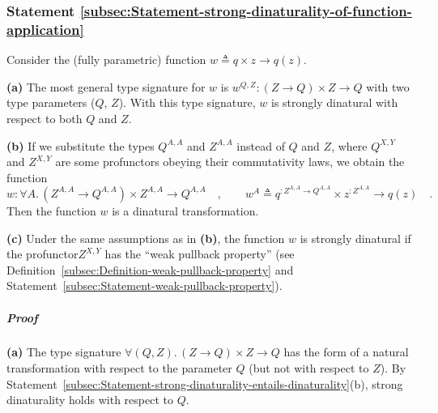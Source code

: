 \subsubsection{Statement \label{subsec:Statement-strong-dinaturality-of-function-application}\ref{subsec:Statement-strong-dinaturality-of-function-application}}

Consider the (fully parametric) function $w\triangleq q\times z\rightarrow q(z)$.

\textbf{(a)} The most general type signature for $w$ is $w^{Q,Z}:(Z\rightarrow Q)\times Z\rightarrow Q$
with two type parameters ($Q$, $Z$). With this type signature, $w$
is strongly dinatural with respect to both $Q$ and $Z$.

\textbf{(b)} If we substitute the types $Q^{A,A}$ and $Z^{A,A}$
instead of $Q$ and $Z$, where $Q^{X,Y}$ and $Z^{X,Y}$ are some
profunctors obeying their commutativity laws, we obtain the function
\[
w:\forall A.\,(Z^{A,A}\rightarrow Q^{A,A})\times Z^{A,A}\rightarrow Q^{A,A}\quad,\quad\quad w^{A}\triangleq q^{:Z^{A,A}\rightarrow Q^{A,A}}\times z^{:Z^{A,A}}\rightarrow q(z)\quad.
\]
Then the function $w$ is a dinatural transformation.

\textbf{(c)} Under the same assumptions as in \textbf{(b)}, the function
$w$ is strongly dinatural if the profunctor$Z^{X,Y}$ has the \textsf{``}weak
pullback property\textsf{''} (see Definition~\ref{subsec:Definition-weak-pullback-property}
and Statement~\ref{subsec:Statement-weak-pullback-property}). %
\begin{comment}
Otherwise, $w$ is \emph{not} necessarily strongly dinatural. \textemdash{}
not clear if we can show a counterexample
\end{comment}


\subparagraph{Proof}

\textbf{(a)} The type signature $\forall(Q,Z).\,(Z\rightarrow Q)\times Z\rightarrow Q$
has the form of a natural transformation with respect to the parameter
$Q$ (but not with respect to $Z$). By Statement~\ref{subsec:Statement-strong-dinaturality-entails-dinaturality}(b),
strong dinaturality holds with respect to $Q$. 

